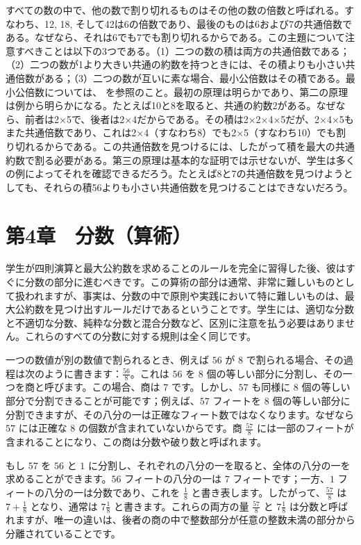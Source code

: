 \documentclass[a4paper,11pt,openany]{ltjsbook}
\begin{document}
すべての数の中で、他の数で割り切れるものはその他の数の倍数と呼ばれる。すなわち、12, 18, そして42は6の倍数であり、最後のものは6および7の共通倍数である。なぜなら、それは6でも7でも割り切れるからである。この主題について注意すべきことは以下の3つである。（1）二つの数の積は両方の共通倍数である；（2）二つの数が1より大きい共通の約数を持つときには、その積よりも小さい共通倍数がある；（3）二つの数が互いに素な場合、最小公倍数はその積である。最小公倍数については、 を参照のこと。最初の原理は明らかであり、第二の原理は例から明らかになる。たとえば10と8を取ると、共通の約数2がある。なぜなら、前者は2×5で、後者は2×4だからである。その積は2×2×4×5だが、2×4×5もまた共通倍数であり、これは2×4（すなわち8）でも2×5（すなわち10）でも割り切れるからである。この共通倍数を見つけるには、したがって積を最大の共通約数で割る必要がある。第三の原理は基本的な証明では示せないが、学生は多くの例によってそれを確認できるだろう。たとえば8と7の共通倍数を見つけようとしても、それらの積56よりも小さい共通倍数を見つけることはできないだろう。

\chapter{第4章　分数（算術）}

学生が四則演算と最大公約数を求めることのルールを完全に習得した後、彼はすぐに分数の部分に進むべきです。この算術の部分は通常、非常に難しいものとして扱われますが、事実は、分数の中で原則や実践において特に難しいものは、最大公約数を見つけ出すルールだけであるということです。学生には、適切な分数と不適切な分数、純粋な分数と混合分数など、区別に注意を払う必要はありません。これらのすべての分数に対する規則は全く同じです。

一つの数値が別の数値で割られるとき、例えば $56$ が $8$ で割られる場合、その過程は次のように書きます：$\frac{56}{8}$。これは $56$ を $8$ 個の等しい部分に分割し、その一つを商と呼びます。この場合、商は $7$ です。しかし、$57$ も同様に $8$ 個の等しい部分で分割できることが可能です；例えば、$57$ フィートを $8$ 個の等しい部分に分割できますが、その八分の一は正確なフィート数ではなくなります。なぜなら $57$ には正確な $8$ の個数が含まれていないからです。商 $\frac{57}{8}$ には一部のフィートが含まれることになり、この商は分数や破り数と呼ばれます。

もし $57$ を $56$ と $1$ に分割し、それぞれの八分の一を取ると、全体の八分の一を求めることができます。$56$ フィートの八分の一は $7$ フィートです；一方、$1$ フィートの八分の一は分数であり、これを $\frac{1}{8}$ と書き表します。したがって、$\frac{57}{8}$ は $7 + \frac{1}{8}$ となり、通常は $7\frac{1}{8}$ と書きます。これらの両方の量 $\frac{57}{8}$ と $7\frac{1}{8}$ は分数と呼ばれますが、唯一の違いは、後者の商の中で整数部分が任意の整数未満の部分から分離されていることです。
\end{document}
